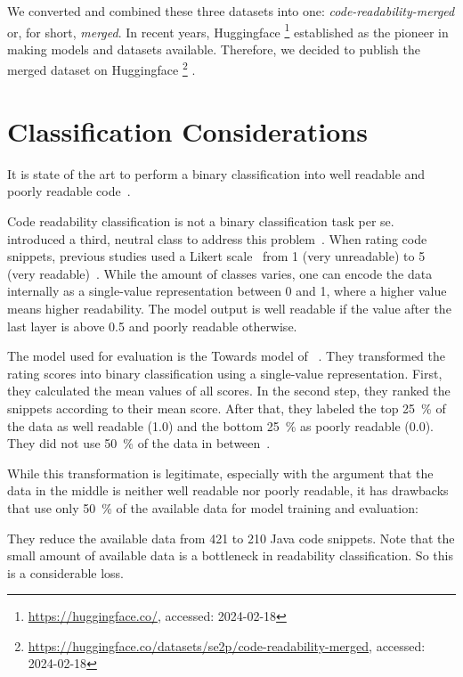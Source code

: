 \documentclass[%
class=scrreprt,
chapterprefix=false,%
open=right,%
twoside=true,%
paper=a4,%
logofile={Logo\_zentral\_farbig\_EN.png},%
thesistype=master,%
UKenglish,%
]{se2thesis}
\newcounter{urlfootnote}
\newcommand{\onecurl}[2]{%
	\stepcounter{urlfootnote}%
	\expandafter\def\csname urlfootnote:#1\endcsname{\theurlfootnote}%
	\footnote{\label{url:#1}\url{#1}, accessed: #2}%
}
\newcommand{\curl}[2]{%
		\onecurl{#1}{#2}%
}
\theoremstyle{definition}
\newcommand{\citeolddataset}{\cite{buse2009learning, dorn2012general, scalabrino2018comprehensive}\xspace}
\begin{document}
    We converted and combined these three datasets into one: \textit{code-readability-merged} or, for short, \textit{merged}. 
    In recent years, Huggingface\curl{https://huggingface.co/}{2024-02-18} established as the pioneer in making models and datasets available. Therefore, we decided to publish the merged dataset on Huggingface\curl{https://huggingface.co/datasets/se2p/code-readability-merged}{2024-02-18}.
	
\section{Classification Considerations} \label{Classification Considerations}
	It is state of the art to perform a binary classification into well readable and poorly readable code~\cite{mi2018inception, mi2018improving, sharma2020egan, mi2022towards, mi2022rank}. 
	
	Code readability classification is not a binary classification task per se. \citeauthor{mi2023graph} introduced a third, neutral class to address this problem~\cite{mi2023graph}. 
    When rating code snippets, previous studies used a Likert scale~\cite{likert1932technique} from 1 (very unreadable) to 5 (very readable)~\citeolddataset. 
    While the amount of classes varies, one can encode the data internally as a single-value representation between 0 and 1, where a higher value means higher readability. The model output is well readable if the value after the last layer is above 0.5 and poorly readable otherwise.
	
	The model used for evaluation is the Towards model of \citeauthor{mi2022towards}~\cite{mi2022towards}. They transformed the rating scores into binary classification using a single-value representation. First, they calculated the mean values of all scores. In the second step, they ranked the snippets according to their mean score. After that, they labeled the top 25~\% of the data as well readable (1.0) and the bottom 25~\% as poorly readable (0.0). They did not use 50~\% of the data in between~\cite{mi2022towards}.
	
	While this transformation is legitimate, especially with the argument that the data in the middle is neither well readable nor poorly readable, it has drawbacks that \citeauthor{mi2022towards} use only 50~\% of the available data for model training and evaluation:
	
	They reduce the available data from 421 to 210 Java code snippets. Note that the small amount of available data is a bottleneck in readability classification. So this is a considerable loss.
	
\end{document}
